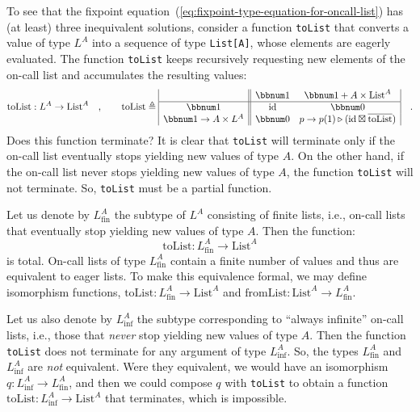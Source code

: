 To see that the fixpoint equation~(\ref{eq:fixpoint-type-equation-for-oncall-list})
has (at least) three inequivalent solutions, consider a function \lstinline!toList!
that converts a value of type $L^{A}$ into a sequence of type \lstinline!List[A]!,
whose elements are eagerly evaluated. The function \lstinline!toList!
keeps recursively requesting new elements of the on-call list and
accumulates the resulting values:
\[
\text{toList}:L^{A}\rightarrow\text{List}^{A}\quad,\quad\quad\text{toList}\triangleq\begin{array}{|c||cc|}
 & \bbnum 1 & \bbnum 1+A\times\text{List}^{A}\\
\hline \bbnum 1 & \text{id} & \bbnum 0\\
\bbnum 1\rightarrow A\times L^{A} & \bbnum 0 & p\rightarrow p(1)\triangleright(\text{id}\boxtimes\overline{\text{toList}})
\end{array}\quad.
\]
Does this function terminate? It is clear that \lstinline!toList!
will terminate only if the on-call list eventually stops yielding
new values of type $A$. On the other hand, if the on-call list never
stops yielding new values of type $A$, the function \lstinline!toList!
will not terminate. So, \lstinline!toList!
must be a partial function. 

Let us denote by $L_{\text{fin}}^{A}$ the subtype of $L^{A}$ consisting
of finite lists, i.e., on-call lists that eventually stop yielding
new values of type $A$. Then the function:
\[
\text{toList}:L_{\text{fin}}^{A}\rightarrow\text{List}^{A}
\]
is total. On-call lists of type $L_{\text{fin}}^{A}$ contain a finite
number of values and thus are equivalent to eager lists. To make this
equivalence formal, we may define isomorphism functions, $\text{toList}:L_{\text{fin}}^{A}\rightarrow\text{List}^{A}$
and $\text{fromList}:\text{List}^{A}\rightarrow L_{\text{fin}}^{A}$. 

Let us also denote by $L_{\text{inf}}^{A}$ the subtype corresponding
to \textsf{``}always infinite\textsf{''} on-call lists, i.e., those that \emph{never}
stop yielding new values of type $A$. Then the function \lstinline!toList!
does not terminate for any argument of type $L_{\text{inf}}^{A}$.
So, the types $L_{\text{fin}}^{A}$ and $L_{\text{inf}}^{A}$ are
\emph{not} equivalent. Were they equivalent, we would have an isomorphism
$q:L_{\text{inf}}^{A}\rightarrow L_{\text{fin}}^{A}$, and then we
could compose $q$ with \lstinline!toList!
to obtain a function $\text{toList}:L_{\text{inf}}^{A}\rightarrow\text{List}^{A}$
that terminates, which is impossible.

